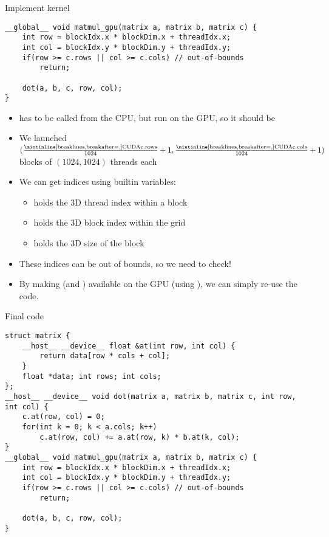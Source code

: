 \begin{frame}[fragile]{Implement kernel}
    \begin{verbatim}
__global__ void matmul_gpu(matrix a, matrix b, matrix c) {
    int row = blockIdx.x * blockDim.x + threadIdx.x;
    int col = blockIdx.y * blockDim.y + threadIdx.y;
    if(row >= c.rows || col >= c.cols) // out-of-bounds
        return;

    dot(a, b, c, row, col);
}
    \end{verbatim}
    \begin{itemize}
        \item<only@1>  has to be called from the CPU, but run on the GPU, so it should be 
        \item<only@2> We launched $(\frac{\text{\CUDA{c.rows}}}{1024} + 1, \frac{\text{\CUDA{c.cols}}}{1024} + 1)$ blocks of $(1024, 1024)$ threads each
        \item<only@2> We can get indices using builtin variables:
        \begin{itemize}
            \item<only@2>  holds the 3D thread index within a block
            \item<only@2>  holds the 3D block index within the grid
            \item<only@2>  holds the 3D size of the block
        \end{itemize}
        \item<only@2> These indices can be out of bounds, so we need to check!
        \item<only@3> By making  (and ) available on the GPU (using ), we can simply re-use the code.
    \end{itemize}
\end{frame}

\begin{frame}[fragile]{Final code}
    \begin{verbatim}
struct matrix {
    __host__ __device__ float &at(int row, int col) {
        return data[row * cols + col];
    }
    float *data; int rows; int cols;
};
__host__ __device__ void dot(matrix a, matrix b, matrix c, int row, int col) {
    c.at(row, col) = 0;
    for(int k = 0; k < a.cols; k++)
        c.at(row, col) += a.at(row, k) * b.at(k, col);
}
__global__ void matmul_gpu(matrix a, matrix b, matrix c) {
    int row = blockIdx.x * blockDim.x + threadIdx.x;
    int col = blockIdx.y * blockDim.y + threadIdx.y;
    if(row >= c.rows || col >= c.cols) // out-of-bounds
        return;

    dot(a, b, c, row, col);
}
    \end{verbatim}
\end{frame}

